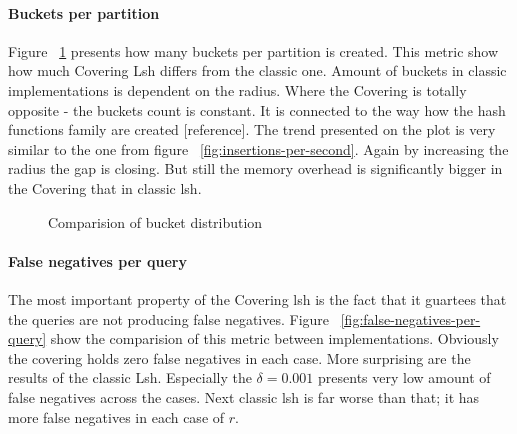 \paragraph{Buckets per partition}

Figure ~\ref{fig:buckets-per-partition} presents how many buckets per partition is created. This metric show how much Covering Lsh differs from the classic one. Amount of buckets in classic implementations is dependent on the radius. Where the Covering is totally opposite - the buckets count is constant. It is connected to the way how the hash functions family are created [reference]. The trend presented on the plot is very similar to the one from figure ~\ref{fig:insertions-per-second}. Again by increasing the radius the gap is closing. But still the memory overhead is significantly bigger in the Covering that in classic lsh.

\begin{figure}[ht]

  \caption{Comparision of bucket distribution}
  \label{fig:buckets-per-partition}
\end{figure}

\paragraph{False negatives per query}

The most important property of the Covering lsh is the fact that it guartees that the queries are not producing false negatives. Figure ~\ref{fig:false-negatives-per-query} show the comparision of this metric between implementations. Obviously the covering holds zero false negatives in each case. More surprising are the results of the classic Lsh. Especially the $\delta = 0.001$ presents very low amount of false negatives across the cases. Next classic lsh is far worse than that; it has more false negatives in each case of $r$.

